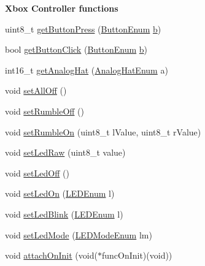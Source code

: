 \begin{Indent}{\bf \-Xbox \-Controller functions}\par
\begin{DoxyCompactItemize}
\item 
uint8\-\_\-t \hyperlink{class_x_b_o_x_u_s_b_a195da02782b0f22a897406c733509802}{get\-Button\-Press} (\hyperlink{controller_enums_8h_a94f7389d205c78830a5441370d7870fd}{\-Button\-Enum} \hyperlink{_p_s4_parser_8h_a4313c9563516f94387762ab05763456b}{b})
\item 
bool \hyperlink{class_x_b_o_x_u_s_b_a997d372f061e434b441e91595160f0d5}{get\-Button\-Click} (\hyperlink{controller_enums_8h_a94f7389d205c78830a5441370d7870fd}{\-Button\-Enum} \hyperlink{_p_s4_parser_8h_a4313c9563516f94387762ab05763456b}{b})
\item 
int16\-\_\-t \hyperlink{class_x_b_o_x_u_s_b_ab427ce47a5f463afa407e2513d4e28a2}{get\-Analog\-Hat} (\hyperlink{controller_enums_8h_a34dad8f0a0927471137c403216597093}{\-Analog\-Hat\-Enum} a)
\item 
void \hyperlink{class_x_b_o_x_u_s_b_a6200dc185ecb6e0d3ffdb2a9ecf49c40}{set\-All\-Off} ()
\item 
void \hyperlink{class_x_b_o_x_u_s_b_a5d9ac92da5086409ad864484bdf95871}{set\-Rumble\-Off} ()
\item 
void \hyperlink{class_x_b_o_x_u_s_b_ae70ae50ed8188a2bf8c25d0ee17f54d9}{set\-Rumble\-On} (uint8\-\_\-t l\-Value, uint8\-\_\-t r\-Value)
\item 
void \hyperlink{class_x_b_o_x_u_s_b_a2cb9786f22e69ec3db26d9a55f95e22e}{set\-Led\-Raw} (uint8\-\_\-t value)
\item 
void \hyperlink{class_x_b_o_x_u_s_b_a155637a4ef946f19c7ee40c0fc1c6b98}{set\-Led\-Off} ()
\item 
void \hyperlink{class_x_b_o_x_u_s_b_a952183a3650619284979cc955fc7774c}{set\-Led\-On} (\hyperlink{controller_enums_8h_a70df64e026046bc352983127b7ae2cf0}{\-L\-E\-D\-Enum} l)
\item 
void \hyperlink{class_x_b_o_x_u_s_b_a402136e2c5ab3a006c0111903459eb35}{set\-Led\-Blink} (\hyperlink{controller_enums_8h_a70df64e026046bc352983127b7ae2cf0}{\-L\-E\-D\-Enum} l)
\item 
void \hyperlink{class_x_b_o_x_u_s_b_a051a2683d76542660dc22b5cf3f9f95c}{set\-Led\-Mode} (\hyperlink{xbox_enums_8h_abb8a1831f62ea139a2255c67bb24330f}{\-L\-E\-D\-Mode\-Enum} lm)
\item 
void \hyperlink{class_x_b_o_x_u_s_b_a887b65866f96b5b1e1413ba1e4f19941}{attach\-On\-Init} (void($\ast$func\-On\-Init)(void))
\end{DoxyCompactItemize}
\end{Indent}
